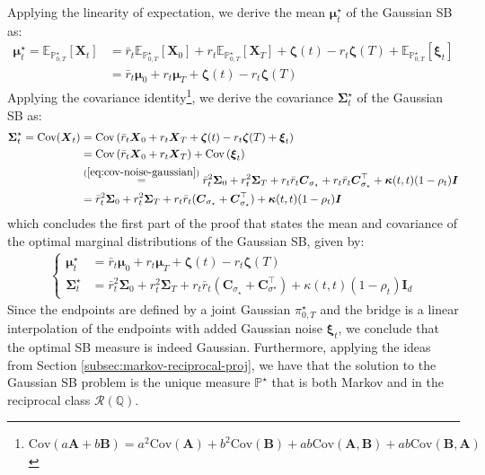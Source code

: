 \documentclass{article}
\begin{document}
Applying the linearity of expectation, we derive the mean $\boldsymbol{\mu}_t^\star$ of the Gaussian SB as:
\begin{align}
    \boldsymbol{\mu}_t^\star=\mathbb{E}_{\mathbb{P}_{0,T}^\star}[\boldsymbol{X}_t]&=\bar{r}_t\mathbb{E}_{\mathbb{P}_{0,T}^\star}[\boldsymbol{X}_0]+r_t\mathbb{E}_{\mathbb{P}_{0,T}^\star}[\boldsymbol{X}_T]+\boldsymbol{\zeta}(t)-r_t\boldsymbol{\zeta}(T)+\mathbb{E}_{\mathbb{P}_{0,T}^\star}[\boldsymbol{\xi}_t]\nonumber\\
    &=\bar{r}_t\boldsymbol{\mu}_0+r_t\boldsymbol{\mu}_T+\boldsymbol{\zeta}(t)-r_t\boldsymbol{\zeta}(T)
\end{align}
Applying the covariance identity\footnote{$\text{Cov}(a\boldsymbol{A}+b\boldsymbol{B})=a^2\text{Cov}(\boldsymbol{A}) +b^2\text{Cov}(\boldsymbol{B})+ab\text{Cov}(\boldsymbol{A}, \boldsymbol{B})+ab\text{Cov}(\boldsymbol{B}, \boldsymbol{A})$}, we derive the covariance $\boldsymbol{\Sigma}^\star_t$ of the Gaussian SB as:
\begin{align}
    \boldsymbol{\Sigma}^\star_t=\text{Cov}(\boldsymbol{X}_t)&=\text{Cov}\left( \bar{r}_t\boldsymbol{X}_0+r_t\boldsymbol{X}_T+\boldsymbol{\zeta}(t)-r_t\boldsymbol{\zeta}(T)+\boldsymbol{\xi}_t\right)\nonumber\\
    &=\text{Cov}\left( \bar{r}_t\boldsymbol{X}_0+r_t\boldsymbol{X}_T\right)+\text{Cov}\left(\boldsymbol{\xi}_t\right)\\
    &\overset{(\ref{eq:cov-noise-gaussian})}{=}\bar{r}_t^2\boldsymbol{\Sigma}_0+r_t^2\boldsymbol{\Sigma}_T+r_t\bar{r}_t\boldsymbol{C}_{\sigma_\star}+r_t\bar{r}_t\boldsymbol{C}_{\sigma_\star}^\top+\boldsymbol{\kappa}(t,t)(1-\rho_t)\boldsymbol{I}\nonumber\\
    &=\bar{r}_t^2\boldsymbol{\Sigma}_0+r_t^2\boldsymbol{\Sigma}_T+r_t\bar{r}_t(\boldsymbol{C}_{\sigma_\star}+\boldsymbol{C}_{\sigma_\star}^\top)+\boldsymbol{\kappa}(t,t)(1-\rho_t)\boldsymbol{I}
\end{align}
which concludes the first part of the proof that states the mean and covariance of the optimal marginal distributions of the Gaussian SB, given by:
\begin{align}
    \boxed{\begin{cases}
        \boldsymbol{\mu}^\star_t&=\bar{r}_t\boldsymbol{\mu}_0+r_t\boldsymbol{\mu}_T+\boldsymbol{\zeta}(t)-r_t\boldsymbol{\zeta}(T)\\
    \boldsymbol{\Sigma}^\star_t&=\bar{r}_t^2\boldsymbol{\Sigma}_0+r_t^2\boldsymbol{\Sigma}_T+r_t\bar{r}_t(\boldsymbol{C}_{\sigma_\star}+\boldsymbol{C}_{\sigma^\star}^\top)+\kappa(t,t)(1-\rho_t)\boldsymbol{I}_d
    \end{cases}}
\end{align}
Since the endpoints are defined by a joint Gaussian $\pi_{0,T}^\star$ and the bridge is a linear interpolation of the endpoints with added Gaussian noise $\boldsymbol{\xi}_t$, we conclude that the optimal SB measure is indeed Gaussian. Furthermore, applying the ideas from Section \ref{subsec:markov-reciprocal-proj}, we have that the solution to the Gaussian SB problem is the unique measure $\mathbb{P}^\star$ that is both Markov and in the reciprocal class $\mathcal{R}(\mathbb{Q})$. 
\end{document}
